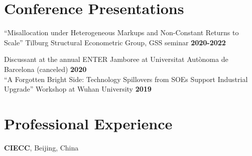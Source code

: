 \documentclass[margin,line]{res}
\newenvironment{list2}{
  \begin{list}{$\bullet$}{%
      \setlength{\itemsep}{0in}
      \setlength{\parsep}{0in} \setlength{\parskip}{0in}
      \setlength{\topsep}{0in} \setlength{\partopsep}{0in} 
      \setlength{\leftmargin}{0.2in}}}{\end{list}}
\begin{document}
\begin{resume}
%

\section{\sc Conference Presentations}
``Misallocation under Heterogeneous Markups and Non-Constant Returns to Scale''
Tilburg Structural Econometric Group, GSS seminar \hfill {\bf 2020-2022}
\vspace{-.3cm}

Discussant at the annual ENTER Jamboree at Universitat Aut\`onoma de Barcelona (canceled) \hfill {\bf 2020}
\vspace{-.3cm}\\


``A Forgotten Bright Side: Technology Spillovers from SOEs Support
Industrial Upgrade'' Workshop at Wuhan University \hfill {\bf 2019}

\section{\sc Professional Experience}
{\bf CIECC}, Beijing, China


\end{resume}
\end{document}
